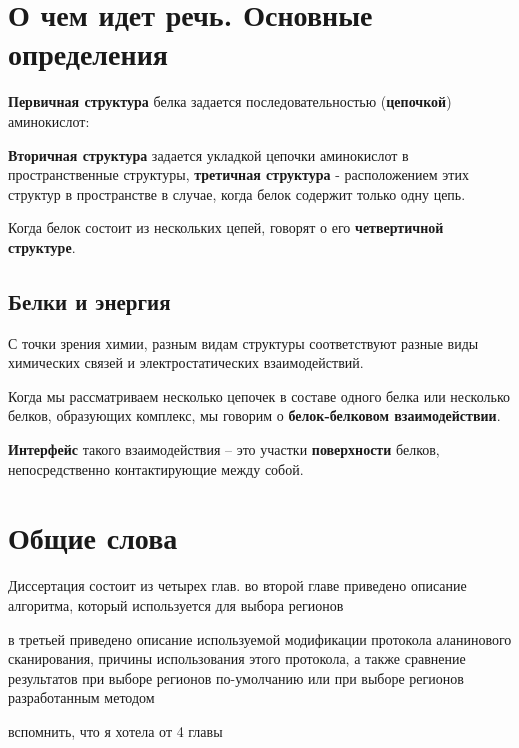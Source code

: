 \intro


\section{О чем идет речь. Основные определения}

\textbf{Первичная структура} белка задается последовательностью (\textbf{цепочкой}) аминокислот:


\textbf{Вторичная структура} задается укладкой цепочки аминокислот в пространственные структуры, \textbf{третичная структура} - расположением этих структур в пространстве в случае, когда белок содержит только одну цепь.

Когда белок состоит из нескольких цепей, говорят о его \textbf{четвертичной структуре}.

\subsection{Белки и энергия}
С точки зрения химии, разным видам структуры соответствуют разные виды химических связей и электростатических взаимодействий.

Когда мы рассматриваем несколько цепочек в составе одного белка или несколько белков, образующих комплекс, мы говорим о \textbf{белок-белковом взаимодействии}.

\textbf{Интерфейс} такого взаимодействия -- это участки \textbf{поверхности} белков, непосредственно контактирующие между собой.



\section{Общие слова}
Диссертация состоит из четырех глав. 
во второй главе приведено описание алгоритма, который используется для выбора регионов

в третьей приведено описание используемой модификации протокола аланинового сканирования, причины использования этого протокола, а также сравнение результатов при выборе регионов по-умолчанию или при выборе регионов разработанным методом 

вспомнить, что я хотела от 4 главы